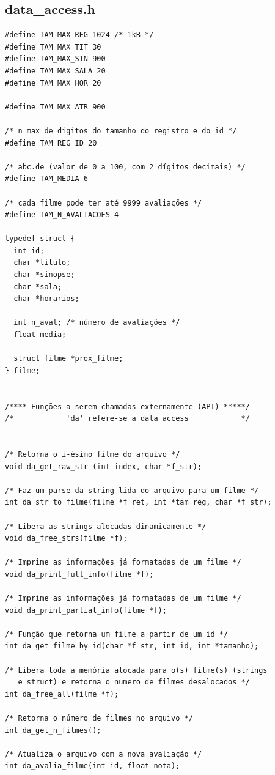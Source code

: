 \documentclass[11pt,twoside]{article}
\begin{document}
\subsection{data\_access.h}
\begin{verbatim}
#define TAM_MAX_REG 1024 /* 1kB */
#define TAM_MAX_TIT 30
#define TAM_MAX_SIN 900
#define TAM_MAX_SALA 20
#define TAM_MAX_HOR 20

#define TAM_MAX_ATR 900

/* n max de digitos do tamanho do registro e do id */
#define TAM_REG_ID 20 

/* abc.de (valor de 0 a 100, com 2 dígitos decimais) */
#define TAM_MEDIA 6 

/* cada filme pode ter até 9999 avaliações */
#define TAM_N_AVALIACOES 4 

typedef struct {
  int id;
  char *titulo;
  char *sinopse;
  char *sala;
  char *horarios;
  
  int n_aval; /* número de avaliações */
  float media;
  
  struct filme *prox_filme;
} filme;


/**** Funções a serem chamadas externamente (API) *****/
/*            'da' refere-se a data access            */


/* Retorna o i-ésimo filme do arquivo */
void da_get_raw_str (int index, char *f_str);

/* Faz um parse da string lida do arquivo para um filme */
int da_str_to_filme(filme *f_ret, int *tam_reg, char *f_str);

/* Libera as strings alocadas dinamicamente */
void da_free_strs(filme *f);

/* Imprime as informações já formatadas de um filme */
void da_print_full_info(filme *f);

/* Imprime as informações já formatadas de um filme */
void da_print_partial_info(filme *f);

/* Função que retorna um filme a partir de um id */
int da_get_filme_by_id(char *f_str, int id, int *tamanho);

/* Libera toda a memória alocada para o(s) filme(s) (strings 
   e struct) e retorna o numero de filmes desalocados */
int da_free_all(filme *f);

/* Retorna o número de filmes no arquivo */
int da_get_n_filmes();

/* Atualiza o arquivo com a nova avaliação */
int da_avalia_filme(int id, float nota);

\end{verbatim}
\end{document}
